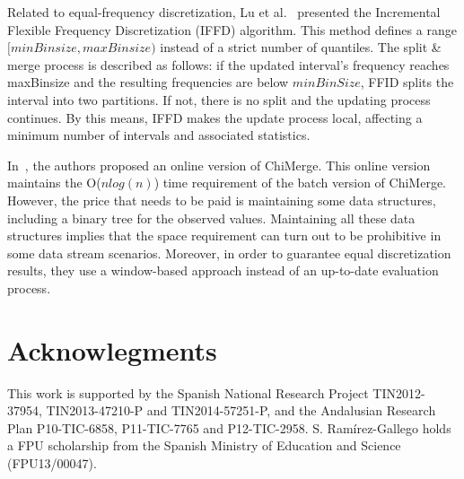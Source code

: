 \documentclass[preprint,12pt]{elsarticle}
\begin{document}
Related to equal-frequency discretization, Lu et al.~\cite{lu06} presented the Incremental Flexible Frequency Discretization (IFFD) algorithm. This method defines a range $[minBinsize, maxBinsize)$ instead of a strict number of quantiles. The split \& merge process is described as follows: if the updated interval's frequency
reaches maxBinsize and the resulting frequencies are below $minBinSize$, FFID splits the interval into two partitions. If not, there is no split and the updating process continues. By this means, IFFD makes the update process local, affecting a minimum number of intervals and associated statistics.


In~\cite{lehti12}, the authors proposed an online version of ChiMerge. This online version maintains the O($nlog(n)$) time requirement of the batch version of ChiMerge. However, the price that needs to be paid is maintaining some data structures, including a binary tree for the observed values. Maintaining all these data structures implies that the space requirement can turn out to be prohibitive in some data stream scenarios. Moreover, in order to guarantee equal discretization results, they use a window-based approach instead of an up-to-date evaluation process.


\section*{Acknowlegments}

This work is supported by the Spanish National Research Project TIN2012-37954, TIN2013-47210-P and TIN2014-57251-P, and the Andalusian Research Plan P10-TIC-6858, P11-TIC-7765 and P12-TIC-2958. S. Ram\'irez-Gallego holds a FPU scholarship from the Spanish Ministry of Education and Science (FPU13/00047).



 



%
%
%
\end{document}
